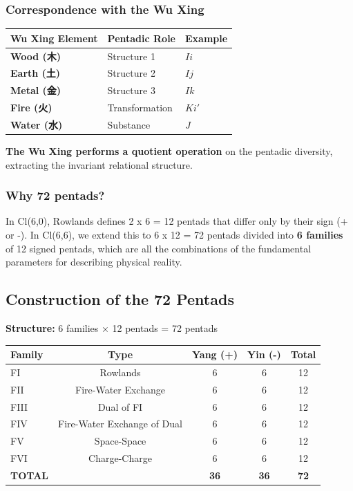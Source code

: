 \documentclass[11pt]{article}
\begin{document}
\hypertarget{correspondence-with-the-wu-xing}{%
\subsubsection{Correspondence with the Wu
Xing}\label{correspondence-with-the-wu-xing}}

\begin{longtable}[]{@{}lll@{}}
\toprule
Wu Xing Element & Pentadic Role & Example \\
\midrule
\endhead
\textbf{Wood (木)} & Structure 1 & \(Ii\) \\
\textbf{Earth (土)} & Structure 2 & \(Ij\) \\
\textbf{Metal (金)} & Structure 3 & \(Ik\) \\
\textbf{Fire (火)} & Transformation & \(Ki'\) \\
\textbf{Water (水)} & Substance & \(J\) \\
\bottomrule
\end{longtable}

\textbf{The Wu Xing performs a quotient operation} on the pentadic
diversity, extracting the invariant relational structure.

\hypertarget{why-72-pentads}{%
\subsubsection{Why 72 pentads?}\label{why-72-pentads}}

In Cl(6,0), Rowlands defines 2 x 6 = 12 pentads that differ only by
their sign (+ or -). In Cl(6,6), we extend this to 6 x 12 = 72 pentads
divided into \textbf{6 families} of 12 signed pentads, which are all the
combinations of the fundamental parameters for describing physical
reality.

\hypertarget{construction-of-the-72-pentads}{%
\subsection{Construction of the 72
Pentads}\label{construction-of-the-72-pentads}}

\textbf{Structure:} 6 families × 12 pentads = 72 pentads

\begin{longtable}{@{}lcccc@{}}
\toprule
\textbf{Family} & \textbf{Type} & \textbf{Yang (+)} & \textbf{Yin (-)} & \textbf{Total} \\
\midrule
FI & Rowlands & 6 & 6 & 12 \\
FII & Fire-Water Exchange & 6 & 6 & 12 \\
FIII & Dual of FI & 6 & 6 & 12 \\
FIV & Fire-Water Exchange of Dual & 6 & 6 & 12 \\
FV & Space-Space & 6 & 6 & 12 \\
FVI & Charge-Charge & 6 & 6 & 12 \\
\midrule
\textbf{TOTAL} & & \textbf{36} & \textbf{36} & \textbf{72} \\
\bottomrule
\end{longtable}
\end{document}
